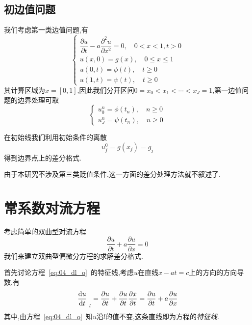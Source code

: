 \subsection{初边值问题}
我们考虑第一类边值问题,有
\begin{equation}
\begin{cases}
\dfrac{\partial u}{\partial t}-a\dfrac{\partial^2 u}{\partial x^2}=0,\quad 0<x<1,t>0 \\
u(x,0)=g(x),\quad 0\leq x\leq 1 \\
u(0,t)=\phi(t),\quad t\geq 0 \\
u(1,t)=\psi(t),\quad t\geq 0 
\end{cases}
\end{equation}
其计算区域为$x=[0,1]$,因此我们分开区间$0=x_0<x_1<\cdots<x_J=1$,第一边值问题的边界处理可取
\begin{equation}
\begin{cases}
u_0^n=\phi(t_n),\quad n\geq0 \\
u_J^n=\psi(t_n),\quad n\geq0
\end{cases}
\end{equation}\par
在初始线我们利用初始条件的离散
\begin{equation}
 u_j^0=g(x_j)=g_j
\end{equation}
得到边界点上的差分格式.\par
由于本研究不涉及第三类贬值条件,这一方面的差分处理方法就不叙述了.
\section{常系数对流方程}
考虑简单的双曲型对流方程
\begin{equation}\label{eq:04_dl_o}
 \dfrac{\partial u}{\partial t}+a\dfrac{\partial u}{\partial x}=0
\end{equation}
我们来建立双曲型偏微分方程的求解差分格式.\par
首先讨论方程~\eqref{eq:04_dl_o}~的特征线,考虑$u$在直线$x-at=c$上的方向的方向导数,有
\begin{equation}
\left.\dfrac{\mathrm{d} u}{\mathrm{d} t}\right|_l = \dfrac{\partial u}{\partial t}+\dfrac{\partial u}{\partial t}
\dfrac{\partial x}{\partial t} = \dfrac{\partial u}{\partial t}+a\dfrac{\partial u}{\partial x}
\end{equation}
其中,由方程~\eqref{eq:04_dl_o}~知$u$沿$l$的值不变,这条直线即为方程的\emph{特征线}.\par
